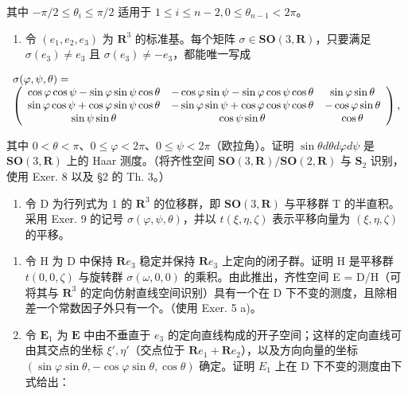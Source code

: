 其中 \(-\pi / 2 \leqslant \theta_{i} \leqslant \pi / 2\) 适用于 \(1 \leqslant i \leqslant n - 2, 0 \leqslant \theta_{n-1} < 2\pi\)。

\begin{enumerate}
\def\labelenumi{\arabic{enumi})}
\setcounter{enumi}{8}
\tightlist
\item
  令 \((e_1, e_2, e_3)\) 为 \(\mathbf{R}^3\) 的标准基。每个矩阵 \(\sigma \in \mathbf{SO}(3, \mathbf{R})\)，只要满足 \(\sigma(e_3) \neq e_3\) 且 \(\sigma(e_3) \neq -e_3\)，都能唯一写成
\end{enumerate}

\[
\begin{array}{l} \sigma (\varphi , \psi , \theta) = \\ \left( \begin{array}{c c c} \cos \varphi   \cos \psi - \sin \varphi   \sin \psi   \cos \theta & - \cos \varphi   \sin \psi - \sin \varphi   \cos \psi   \cos \theta & \sin \varphi   \sin \theta \\ \sin \varphi   \cos \psi + \cos \varphi   \sin \psi   \cos \theta & - \sin \varphi   \sin \psi + \cos \varphi   \cos \psi   \cos \theta & - \cos \varphi   \sin \theta \\ \sin \psi   \sin \theta & \cos \psi   \sin \theta & \cos \theta \end{array} \right), \end{array}
\]

其中 \(0 < \theta < \pi\)、\(0 \leqslant \varphi < 2\pi\)、\(0 \leqslant \psi < 2\pi\)（欧拉角）。证明 \(\sin \theta d\theta d\varphi d\psi\) 是 \(\mathbf{SO}(3, \mathbf{R})\) 上的 Haar 测度。（将齐性空间 \(\mathbf{SO}(3, \mathbf{R}) / \mathbf{SO}(2, \mathbf{R})\) 与 \(\mathbf{S}_2\) 识别，使用 Exer. 8 以及 §2 的 Th. 3。）

\begin{enumerate}
\def\labelenumi{\arabic{enumi})}
\setcounter{enumi}{9}
\tightlist
\item
  令 D 为行列式为 1 的 \(\mathbf{R}^{3}\) 的位移群，即 \(\mathbf{SO}(3,\mathbf{R})\) 与平移群 T 的半直积。采用 Exer. 9 的记号 \(\sigma(\varphi,\psi,\theta)\)，并以 \(t(\xi,\eta,\zeta)\) 表示平移向量为 \((\xi,\eta,\zeta)\) 的平移。
\end{enumerate}

\begin{enumerate}
\def\labelenumi{\alph{enumi})}
\item
  令 H 为 D 中保持 \(\mathbf{R}e_{3}\) 稳定并保持 \(\mathbf{R}e_{3}\) 上定向的闭子群。证明 H 是平移群 \(t(0,0,\zeta)\) 与旋转群 \(\sigma(\omega,0,0)\) 的乘积。由此推出，齐性空间 E = D/H（可将其与 \(\mathbf{R}^{3}\) 的定向仿射直线空间识别）具有一个在 D 下不变的测度，且除相差一个常数因子外只有一个。（使用 Exer. 5 a)。
\item
  令 \(\mathbf{E}_1\) 为 \(\mathbf{E}\) 中由不垂直于 \(e_3\) 的定向直线构成的开子空间；这样的定向直线可由其交点的坐标 \(\xi', \eta'\)（交点位于 \(\mathbf{R}e_{1} + \mathbf{R}e_{2}\)），以及方向向量的坐标 \((\sin \varphi \sin \theta, -\cos \varphi \sin \theta, \cos \theta)\) 确定。证明 \(E_{1}\) 上在 D 下不变的测度由下式给出：
\end{enumerate}

